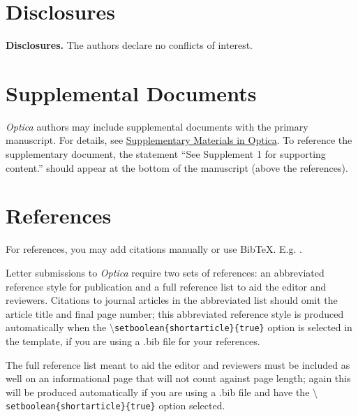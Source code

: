\documentclass[9pt,twocolumn,twoside]{optica}
\begin{document}
\section*{Disclosures}

\medskip

\noindent\textbf{Disclosures.} The authors declare no conflicts of interest.

\section*{Supplemental Documents}
\emph{Optica} authors may include supplemental documents with the primary manuscript. For details, see \href{http://www.opticsinfobase.org/submit/style/supplementary-materials-optica.cfm}{Supplementary Materials in Optica}. To reference the supplementary document, the statement ``See Supplement 1 for supporting content.'' should appear at the bottom of the manuscript (above the references).


\section*{References}

For references, you may add citations manually or use BibTeX. E.g. \cite{Zhang:14}.

Letter submissions to \emph{Optica} require two sets of references: an abbreviated reference style for publication and a full reference list to aid the editor and reviewers. Citations to journal articles in the abbreviated list should omit the article title and final page number; this abbreviated reference style is produced automatically when the \texttt{$\setminus$setboolean\{shortarticle\}\{true\}} option is selected in the template, if you are using a .bib file for your references.
 
The full reference list meant to aid the editor and reviewers must be included as well on an informational page that will not count against page length; again this will be produced automatically if you are using a .bib file and have the \texttt{$\setminus$setboolean\{shortarticle\}\{true\}} option selected.





\end{document}

